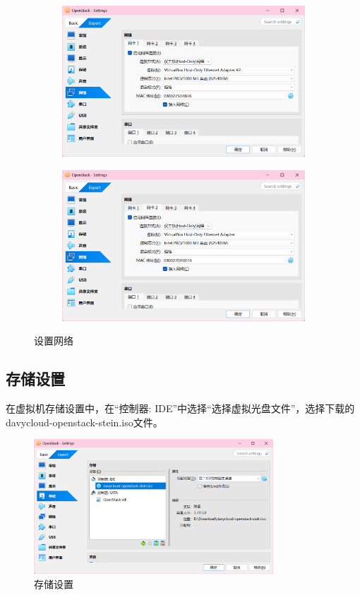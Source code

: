 \documentclass{article}
\begin{document}
\begin{figure}[H]
    \centering
    \begin{subfigure}[b]{0.45\textwidth}
        \includegraphics[width=\textwidth]{img/3.1.png}
    \end{subfigure}
    \begin{subfigure}[b]{0.45\textwidth}
        \includegraphics[width=\textwidth]{img/3.2.png}
    \end{subfigure}
    \caption{设置网络}
\end{figure}

\subsection{存储设置}

在虚拟机存储设置中，在``控制器: IDE''中选择``选择虚拟光盘文件''，选择下载的davycloud-openstack-stein.iso文件。

\begin{figure}[H]
    \centering
    \includegraphics[width=0.8\textwidth]{img/4.1.png}
    \caption{存储设置}
\end{figure}
\end{document}
